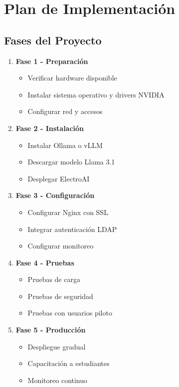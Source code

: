 \documentclass[12pt,letterpaper]{article}
\begin{document}
\section{Plan de Implementaci\'on}

\subsection{Fases del Proyecto}

\begin{enumerate}
    \item \textbf{Fase 1 - Preparaci\'on}
    \begin{itemize}
        \item Verificar hardware disponible
        \item Instalar sistema operativo y drivers NVIDIA
        \item Configurar red y accesos
    \end{itemize}

    \item \textbf{Fase 2 - Instalaci\'on}
    \begin{itemize}
        \item Instalar Ollama o vLLM
        \item Descargar modelo Llama 3.1
        \item Desplegar ElectroAI
    \end{itemize}

    \item \textbf{Fase 3 - Configuraci\'on}
    \begin{itemize}
        \item Configurar Nginx con SSL
        \item Integrar autenticaci\'on LDAP
        \item Configurar monitoreo
    \end{itemize}

    \item \textbf{Fase 4 - Pruebas}
    \begin{itemize}
        \item Pruebas de carga
        \item Pruebas de seguridad
        \item Pruebas con usuarios piloto
    \end{itemize}

    \item \textbf{Fase 5 - Producci\'on}
    \begin{itemize}
        \item Despliegue gradual
        \item Capacitaci\'on a estudiantes
        \item Monitoreo continuo
    \end{itemize}
\end{enumerate}
\end{document}
